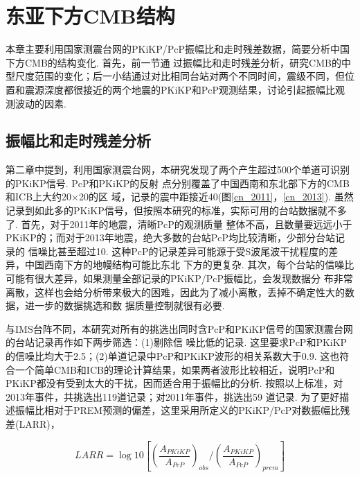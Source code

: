 \chapter{东亚下方CMB结构}

本章主要利用国家测震台网的PKiKP/PcP振幅比和走时残差数据，简要分析中国下方CMB的结构变化. 首先，前一节通
过振幅比和走时残差分析，研究CMB的中型尺度范围的变化；后一小结通过对比相同台站对两个不同时间，震级不同，但位置和震源深度都很接近的两个地震的PKiKP和PcP观测结果，讨论引起振幅比观测波动的因素. 

\section{振幅比和走时残差分析}

第二章中提到，利用国家测震台网，本研究发现了两个产生超过500个单道可识别的PKiKP信号. PcP和PKiKP的反射
点分别覆盖了中国西南和东北部下方的CMB和ICB上大约20{\textdegree}$\times$20{\textdegree}的区
域，记录的震中距接近40{\textdegree}(图\ref{cn_2011}，\ref{cn_2013}). 虽然记录到如此多的PKiKP信号，但按照本研究的标准，实际可用的台站数据就不多了. 首先，对于2011年的地震，清晰PcP的观测质量
整体不高，且数量要远远小于PKiKP的；而对于2013年地震，绝大多数的台站PcP均比较清晰，少部分台站记录的
信噪比甚至超过10. 这种PcP的记录差异可能源于受S波尾波干扰程度的差异，中国西南下方的地幔结构可能比东北
下方的更复杂. 其次，每个台站的信噪比可能有很大差异，如果测量全部记录的PKiKP/PcP振幅比，会发现数据分
布非常离散，这样也会给分析带来极大的困难，因此为了减小离散，丢掉不确定性大的数据，进一步的数据挑选和数
据质量控制就很有必要. 

与IMS台阵不同，本研究对所有的挑选出同时含PcP和PKiKP信号的国家测震台网的台站记录再作如下两步筛选：(1)剔除信
噪比低的记录. 这里要求PcP和PKiKP的信噪比均大于2.5；(2)单道记录中PcP和PKiKP波形的相关系数大于0.9. 这也符合一个简单CMB和ICB的理论计算结果，如果两者波形比较相近，说明PcP和PKiKP都没有受到太大的干扰，因而适合用于振幅比的分析. 按照以上标准，对2013年事件，共挑选出119道记录；对2011年事件，挑选出59
道记录. 为了更好描述振幅比相对于PREM预测的偏差，这里采用\citet{Koper2004a}所定义的PKiKP/PcP对数振幅比残差(LARR)，

\begin{equation}
LARR = \log 10 \left[\left(\frac{A_{PKiKP}}{A_{PcP}}\right)_{obs}\biggl/\left(\frac{A_{PKiKP}}{A_{PcP}}\right)_{prem}\right]
\end{equation}

